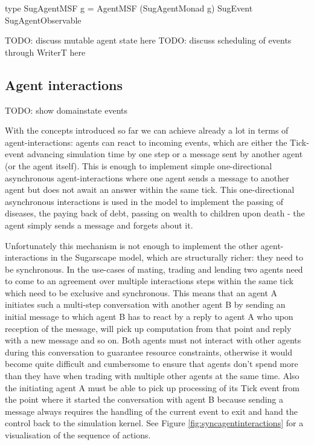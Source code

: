 type SugAgentMSF g = AgentMSF (SugAgentMonad g) SugEvent SugAgentObservable


TODO: discuss mutable agent state here
TODO: discuss scheduling of events through WriterT here

\subsection{Agent interactions}
TODO: show domainstate events

With the concepts introduced so far we can achieve already a lot in terms of agent-interactions: agents can react to incoming events, which are either the Tick-event advancing simulation time by one step or a message sent by another agent (or the agent itself). This is enough to implement simple one-directional asynchronous agent-interactions where one agent sends a message to another agent but does not await an answer within the same tick. This one-directional asynchronous interactions is used in the model to implement the passing of diseases, the paying back of debt, passing on wealth to children upon death - the agent simply sends a message and forgets about it.

Unfortunately this mechanism is not enough to implement the other agent-interactions in the Sugarscape model, which are structurally richer: they need to be synchronous. In the use-cases of mating, trading and lending two agents need to come to an agreement over multiple interactions steps within the same tick which need to be exclusive and synchronous.  This means that an agent A initiates such a multi-step conversation with another agent B by sending an initial message to which agent B has to react by a reply to agent A who upon reception of the message, will pick up computation from that point and reply with a new message and so on. Both agents must not interact with other agents during this conversation to guarantee resource constraints, otherwise it would become quite difficult and cumbersome to ensure that agents don't spend more than they have when trading with multiple other agents at the same time. Also the initiating agent A must be able to pick up processing of its Tick event from the point where it started the conversation with agent B because sending a message always requires the handling of the current event to exit and hand the control back to the simulation kernel. See Figure \ref{fig:syncagentinteractions} for a visualisation of the sequence of actions.

